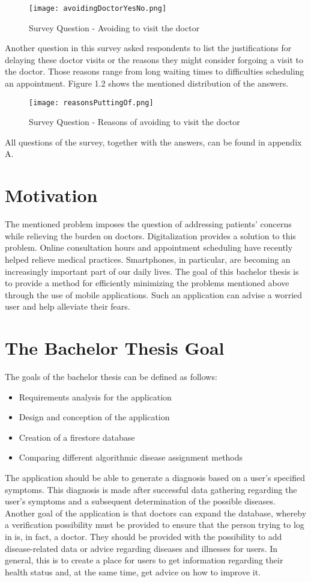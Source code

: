 \begin{figure}[H]
	\centering
	\texttt{[image: avoidingDoctorYesNo.png]}
	\caption[Survey Question]{Survey Question - Avoiding to visit the doctor}
\end{figure}
\noindent 
Another question in this survey asked respondents to list the justifications for delaying these doctor visits or the reasons they might consider forgoing a visit to the doctor. Those reasons range from long waiting times to difficulties scheduling an appointment. Figure 1.2 shows the mentioned distribution of the answers.
\begin{figure}[H]
	\centering
	\texttt{[image: reasonsPuttingOf.png]}
	\caption[Survey Question]{Survey Question - Reasons of avoiding to visit the doctor}
\end{figure}
\noindent 
All questions of the survey, together with the answers, can be found in appendix A.
\section{Motivation}
The mentioned problem imposes the question of addressing patients’ concerns while relieving the burden on doctors. Digitalization provides a solution to this problem. Online consultation hours and appointment scheduling have recently helped relieve medical practices. Smartphones, in particular, are becoming an increasingly important part of our daily lives. The goal of this bachelor thesis is to provide a method for efficiently minimizing the problems mentioned above through the use of mobile applications. Such an application can advise a worried user and help alleviate their fears.

\section{The Bachelor Thesis Goal}
The goals of the bachelor thesis can be defined as follows:
\begin{itemize}
	\item Requirements analysis for the application
	\item Design and conception of the application
	\item Creation of a firestore database
	\item Comparing different algorithmic disease assignment methods
\end{itemize}
The application should be able to generate a diagnosis based on a user's specified symptoms. This diagnosis is made after successful data gathering regarding the user's symptoms and a subsequent determination of the possible diseases. Another goal of the application is that doctors can expand the database, whereby a verification possibility must be provided to ensure that the person trying to log in is, in fact, a doctor. They should be provided with the possibility to add disease-related data or advice regarding diseases and illnesses for users. In general, this is to create a place for users to get information regarding their health status and, at the same time, get advice on how to improve it.

